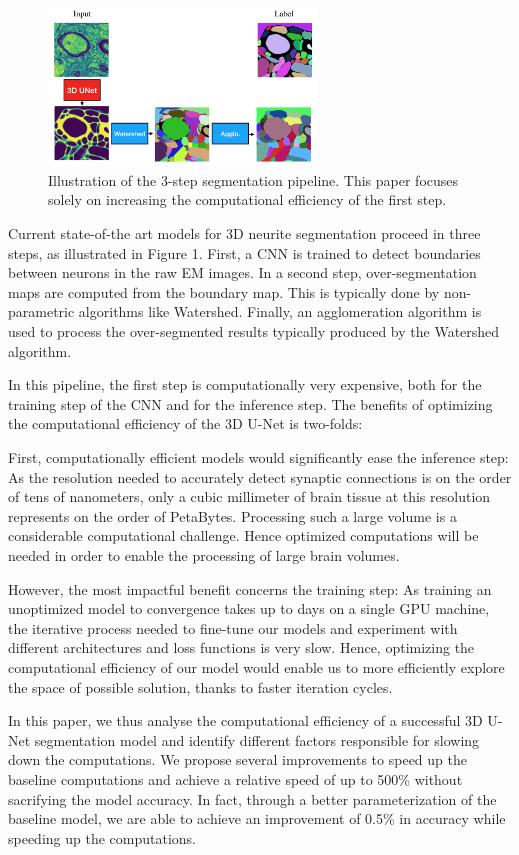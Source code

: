 \documentclass[runningheads]{llncs}
\begin{document}
\begin{figure}[h]
\centering
\includegraphics[width=2.8in]{Pipeline.png}
\caption{
Illustration of the 3-step segmentation pipeline. 
This paper focuses solely on increasing the computational efficiency of the first step.
}
\end{figure}

Current state-of-the art models for 3D neurite segmentation proceed in three steps, as illustrated in Figure 1. 
First, a CNN is trained to detect boundaries between neurons in the raw EM images. 
In a second step, over-segmentation maps are computed from the boundary map. 
This is typically done by non-parametric algorithms like Watershed. 
Finally, an agglomeration algorithm is used to process the over-segmented results typically produced by the Watershed algorithm. 

In this pipeline, the first step is computationally very expensive, 
both for the training step of the CNN and for the inference step.
The benefits of optimizing the computational efficiency of the 3D U-Net is two-folds: 

First, computationally efficient models would significantly ease the inference step: 
As the resolution needed to accurately detect synaptic connections is on the order of tens of nanometers,
only a cubic millimeter of brain tissue at this resolution represents on the order of PetaBytes. 
Processing such a large volume is a considerable computational challenge. 
Hence optimized computations will be needed in order to enable the processing of large brain volumes.

However, the most impactful benefit concerns the training step: 
As training an unoptimized model to convergence takes up to days on a single GPU machine, 
the iterative process needed to fine-tune our models 
and experiment with different architectures and loss functions is very slow. 
Hence, optimizing the computational efficiency of our model would enable us to more efficiently explore the space of possible solution, 
thanks to faster iteration cycles. 

In this paper, we thus analyse the computational efficiency of a successful 3D U-Net segmentation model
and identify different factors responsible for slowing down the computations. 
We propose several improvements to speed up the baseline computations and achieve a relative speed of up to 500\% 
without sacrifying the model accuracy.
In fact, through a better parameterization of the baseline model, 
we are able to achieve an improvement of 0.5\% in accuracy while speeding up the computations.  
\end{document}
